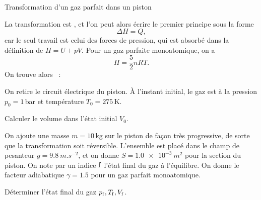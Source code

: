 \begin{exo}[PT][1][devoir]{Transformation d'un gaz parfait dans un piston}
\begin{quest}
{  La transformation est , et l'on peut alors écrire le premier principe sous la forme
  $$
\Delta H = Q,
  $$
  car le seul travail est celui des forces de pression, qui est absorbé dans la définition de $H = U+pV$. Pour un gaz parfaite monoatomique, on a 
   $$H= \frac{5}{2}nRT.$$ On trouve alors
\AN~: 
	}
\end{quest}
On retire le circuit électrique du piston. À l'instant initial, le gaz est à la pression $p_0=1\,$bar et température $T_0=275\,$K.
\begin{quest}
\setcounter{enumi}{3}
\item Calculer le volume dans l'état initial $V_0$.

\end{quest}
 On ajoute une masse $m=10\,$kg sur le piston de façon très progressive, de sorte que la transformation soit réversible. L'ensemble est placé dans le champ de pesanteur $g=\SI{9.8}{m.s^{-2}}$, et on donne $S=\SI{1.0e-3}{m^2}$ pour la section du piston. On note par un indice $\rm f$ l'état final du gaz à l'équilibre. On donne le facteur adiabatique $\gamma=\num{1.5}$ pour un gaz parfait monoatomique.
\begin{quest}


\item  Déterminer l'état final du gaz $p_{\rm f}, T_{\rm f}, V_{\rm f}$.

\end{quest}
\end{exo}

